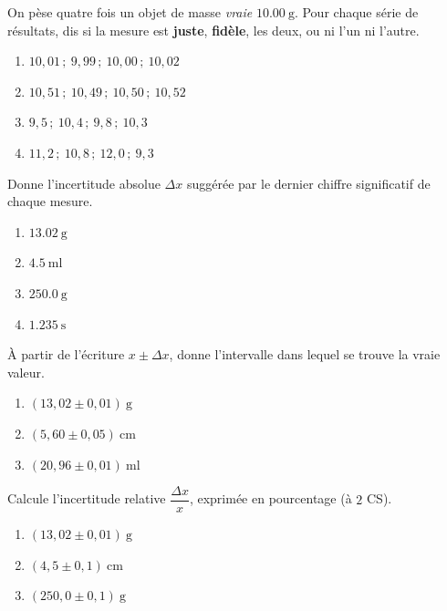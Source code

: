 \documentclass[11pt,a4paper]{article}
\begin{document}
\begin{exo}
On pèse quatre fois un objet de masse \emph{vraie} $\qty{10,00}{\gram}$. Pour chaque série de résultats,
dis si la mesure est \textbf{juste}, \textbf{fidèle}, les deux, ou ni l'un ni l'autre.
\begin{enumerate}[label=\alph*)]
  \item $10,01\,;\ 9,99\,;\ 10,00\,;\ 10,02$
  \item $10,51\,;\ 10,49\,;\ 10,50\,;\ 10,52$
  \item $9,5\,;\ 10,4\,;\ 9,8\,;\ 10,3$
  \item $11,2\,;\ 10,8\,;\ 12,0\,;\ 9,3$
\end{enumerate}
\end{exo}

\begin{exo}
Donne l'incertitude absolue $\Delta x$ suggérée par le dernier chiffre significatif de chaque mesure.
\begin{enumerate}[label=\alph*)]
  \item $\qty{13,02}{\gram}$
  \item $\qty{4,5}{\milli\litre}$
  \item $\qty{250,0}{\gram}$
  \item $\qty{1,235}{\second}$
\end{enumerate}
\end{exo}

\begin{exo}
À partir de l'écriture $x\pm\Delta x$, donne l'intervalle dans lequel se trouve la vraie valeur.
\begin{enumerate}[label=\alph*)]
  \item $(13,02\pm0,01)\ \si{\gram}$
  \item $(5,60\pm0,05)\ \si{\centi\metre}$
  \item $(20,96\pm0,01)\ \si{\milli\litre}$
\end{enumerate}
\end{exo}

\begin{exo}
Calcule l'incertitude relative $\dfrac{\Delta x}{x}$, exprimée en pourcentage (à $2$ CS).
\begin{enumerate}[label=\alph*)]
  \item $(13,02\pm0,01)\ \si{\gram}$
  \item $(4,5\pm0,1)\ \si{\centi\metre}$
  \item $(250,0\pm0,1)\ \si{\gram}$
\end{enumerate}
\end{exo}
\end{document}
